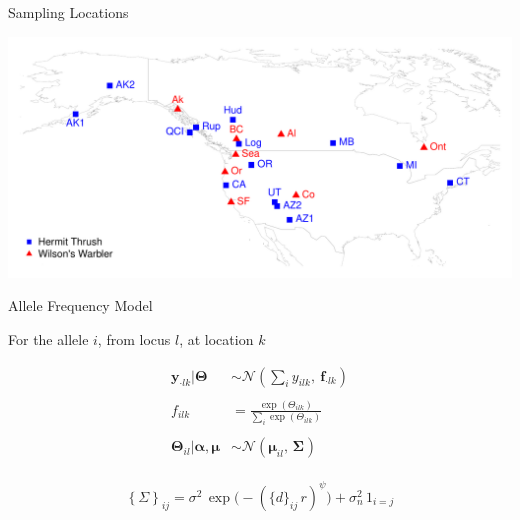 \documentclass[11pt,ignorenonframetext,]{beamer}
\begin{document}
\begin{frame}{Sampling Locations}

\begin{center}
\includegraphics[width=\textwidth]{figs/sampling_locs.pdf}
\end{center}

\end{frame}

\begin{frame}{Allele Frequency Model}

For the allele \(i\), from locus \(l\), at location \(k\)

\[
\begin{aligned}
\bm{y}_{\cdot l k}|\bm{\Theta} &\sim \mathcal{N}\left(\textstyle\sum_i y_{ilk},\: \bm{f}_{\cdot l k}\right) \\
\\
f_{ilk} &= \frac{\exp(\Theta_{ilk})}{\sum_i \exp(\Theta_{ilk})} \\
\\
\bm{\Theta}_{il}|\bm{\alpha},\bm{\mu} &\sim \mathcal{N}( \bm{\mu}_{il},\, \bm{\Sigma_{}}) \\
\end{aligned}
\]

\[ \left\{\Sigma\right\}_{ij} = \sigma^2 \, \exp \Big(-(\{d\}_{ij}\, r)^{\psi} \Big) + \sigma^2_n \, {1}_{i=j} \]

\end{frame}
\end{document}
